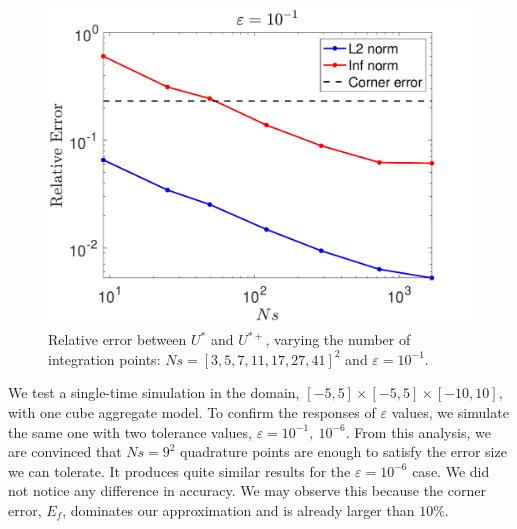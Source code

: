 \begin{figure}[ht]
	\begin{center}
		\includegraphics[scale=0.4]{./figures/fig_Ef_Eg_ep-1}
	\caption{Relative error between $U^*$ and $U^{*+}$, varying the number of integration points: $Ns = [3, 5, 7, 11, 17, 27,41]^2$ and $\varepsilon = 10^{-1}$.}
	\label{fig_Ef_EG_compare}
\end{center}
\end{figure}
We test a single-time simulation in the domain,  $[-5, 5] \times [-5, 5] \times [-10, 10]$,  with one cube aggregate model. To confirm the responses of $\varepsilon$ values, we simulate the same one with two tolerance values, $\varepsilon = 10^{-1}, \ 10^{-6}$.
From this analysis, we are convinced that $Ns = 9^2$ quadrature points are enough to satisfy the error size we can tolerate. It produces quite similar results for the $\varepsilon = 10^{-6}$ case. We did not notice any difference in accuracy. We may observe this because the corner error, $E_f$, dominates our approximation and is already larger than $10 \%$. 

